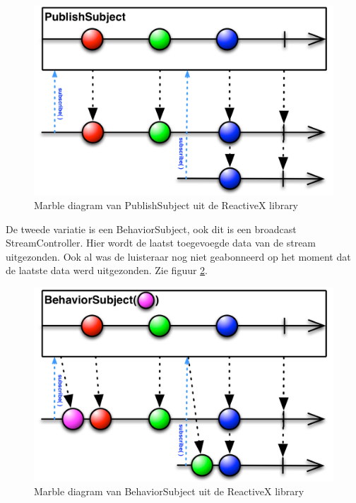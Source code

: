 \begin{figure}[H]
    \centering
    \includegraphics[width=\figureWidthModifier\linewidth]{img/stand-van-zaken/rxdart-publishsubject.png}
    \caption{Marble diagram van PublishSubject uit de ReactiveX library \autocite{Boelens2018}}
    \label{fig:rxdart-publishsubject}
\end{figure}

De tweede variatie is een BehaviorSubject, ook dit is een broadcast StreamController. Hier wordt de laatst toegevoegde data van de stream uitgezonden. Ook al was de luisteraar nog niet geabonneerd op het moment dat de laatste data werd uitgezonden. Zie figuur \ref{fig:rxdart-behaviorsubject}. 

\begin{figure}[H]
    \centering
    \includegraphics[width=\figureWidthModifier\linewidth]{img/stand-van-zaken/rxdart-behaviorsubject.png}
    \caption{Marble diagram van BehaviorSubject uit de ReactiveX library \autocite{Boelens2018}}
    \label{fig:rxdart-behaviorsubject}
\end{figure}

